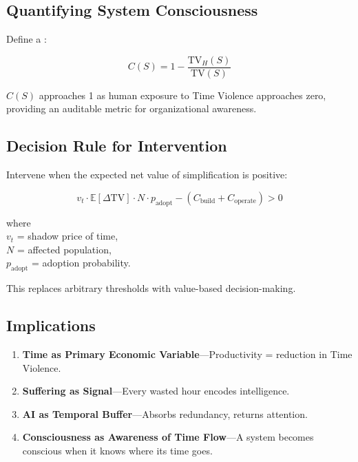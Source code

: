 \subsection{Quantifying System Consciousness}
\label{sec:consciousness-index}

Define a :

\begin{equation}
\label{eq:consciousness}
C(S) = 1 - \frac{\text{TV}_H(S)}{\text{TV}(S)}
\end{equation}

$C(S)$ approaches 1 as human exposure to Time Violence approaches zero, providing an auditable metric for organizational awareness.

\subsection{Decision Rule for Intervention}
\label{sec:decision-rule}

Intervene when the expected net value of simplification is positive:

\begin{equation}
\label{eq:intervention-rule}
v_t \cdot \mathbb{E}[\Delta \text{TV}] \cdot N \cdot p_{\text{adopt}} - (C_{\text{build}} + C_{\text{operate}}) > 0
\end{equation}

where\\
$v_t$ = shadow price of time,\\
$N$ = affected population,\\
$p_{\text{adopt}}$ = adoption probability.

This replaces arbitrary thresholds with value-based decision-making.

\subsection{Implications}
\label{sec:theory-implications}

\begin{enumerate}
    \item \textbf{Time as Primary Economic Variable}—Productivity = reduction in Time Violence.
    \item \textbf{Suffering as Signal}—Every wasted hour encodes intelligence.
    \item \textbf{AI as Temporal Buffer}—Absorbs redundancy, returns attention.
    \item \textbf{Consciousness as Awareness of Time Flow}—A system becomes conscious when it knows where its time goes.
\end{enumerate}
